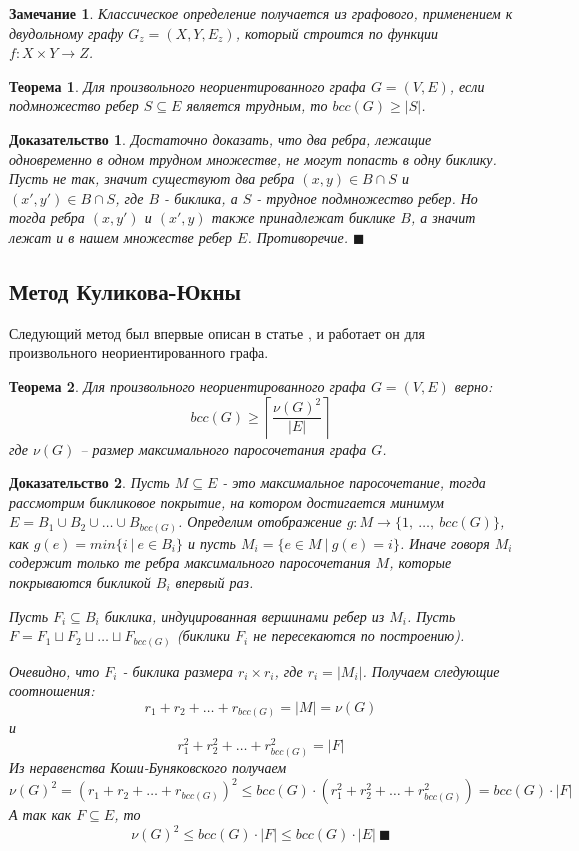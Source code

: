 \documentclass[a4paper]{article}
\newtheorem*{mremark}{Замечание}
\newtheorem{mtheorem}{Теорема}[section]
\newtheorem*{msolution}{Доказательство}
\begin{document}
\begin{mremark}
	Классическое определение получается из графового, применением к двудольному графу $G_z = (X, Y, E_z)$, 
	который строится по функции $f: X\times Y \rightarrow Z$.
\end{mremark}

	
\begin{mtheorem}
    Для произвольного неориентированного графа $G = (V, E)$, если подмножество ребер $S \subseteq E$ 
    является трудным, то $bcc(G) \geq |S|$.
\end{mtheorem}

\begin{msolution}
    Достаточно доказать, что два ребра, лежащие одновременно в одном трудном множестве, не могут 
    попасть в одну биклику. Пусть не так, значит существуют два ребра $(x, y)\in B\cap S$ и 
    $(x', y')\in B\cap S$, где $B$ - биклика, а $S$ - трудное подмножество ребер. Но тогда ребра 
    $(x, y')$ и $(x', y)$ также принадлежат биклике $B$, а значит лежат и в нашем множестве ребер 
    $E$. Противоречие. $\blacksquare$
\end{msolution}

\subsection{Метод Куликова-Юкны}
Следующий метод был впервые описан в статье \cite{KulikovJukna}, и работает он для произвольного 
неориентированного графа.

\begin{mtheorem}
    Для произвольного неориентированного графа $G = (V, E)$ верно: $$bcc(G)\geq \left\lceil\frac{\nu(G)^2}{|E|}\right\rceil$$ 
    где $\nu(G)$ -- размер максимального паросочетания графа $G$.
\end{mtheorem}

\begin{msolution}
	Пусть $M\subseteq E$ - это максимальное паросочетание, тогда рассмотрим бикликовое покрытие, 
	на котором достигается минимум $E = B_1\cup B_2\cup \ldots \cup B_{bcc(G)}$. Определим 
	отображение $g:M\rightarrow \{1,\ \ldots,\ bcc(G)\}$, как $g(e) = min\{i\ |\ e\in B_i\}$ и пусть 
	$M_i = \{e\in M\ |\ g(e) = i\}$. Иначе говоря $M_i$ содержит только те ребра максимального 
	паросочетания $M$, которые покрываются бикликой $B_i$ впервый раз.
	
	Пусть $F_i \subseteq B_i$ биклика, индуцированная вершинами ребер из $M_i$. Пусть 
	$F = F_1\sqcup F_2\sqcup \ldots \sqcup F_{bcc(G)}$ (биклики $F_i$ не пересекаются по построению).
	
	Очевидно, что $F_i$ - биклика размера $r_i\times r_i$, где $r_i = |M_i|$. Получаем следующие 
	соотношения: $$r_1 + r_2 + \ldots + r_{bcc(G)} = |M| = \nu(G)$$ и 
	$$r_1^2 + r_2^2 + \ldots + r_{bcc(G)}^2 = |F|$$ Из неравенства Коши-Буняковского получаем 
	$$\nu(G)^2 = (r_1 + r_2 + \ldots + r_{bcc(G)})^2 \leq bcc(G)\cdot (r_1^2 + r_2^2 + \ldots + r_{bcc(G)}^2) = bcc(G)\cdot |F|$$
	А так как $F \subseteq E$, то $$\nu(G)^2\leq bcc(G)\cdot |F| \leq bcc(G)\cdot |E|\ \blacksquare$$

\end{msolution}
\end{document}
